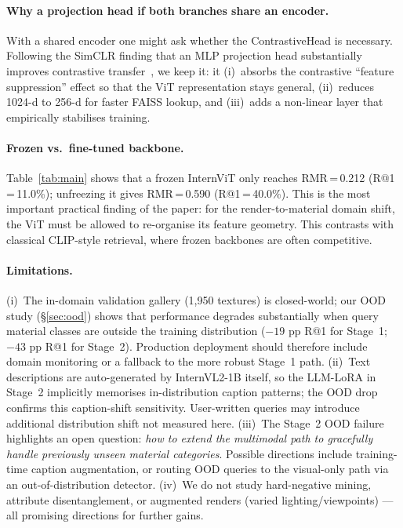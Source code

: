 \documentclass[10pt,twocolumn]{article}
\begin{document}
\paragraph{Why a projection head if both branches share an encoder.}
With a shared encoder one might ask whether the ContrastiveHead is necessary.
Following the SimCLR finding that an MLP projection head substantially
improves contrastive transfer~\cite{chen2020simclr}, we keep it: it
(i)~absorbs the contrastive ``feature suppression'' effect so that the ViT
representation stays general,
(ii)~reduces 1024-d to 256-d for faster FAISS lookup, and
(iii)~adds a non-linear layer that empirically stabilises training.

\paragraph{Frozen vs.\ fine-tuned backbone.}
Table~\ref{tab:main} shows that a frozen InternViT only reaches
RMR\,=\,0.212 (R@1\,=\,11.0\%); unfreezing it gives RMR\,=\,0.590
(R@1\,=\,40.0\%).
This is the most important practical finding of the paper: for the
render-to-material domain shift, the ViT must be allowed to re-organise
its feature geometry.
This contrasts with classical CLIP-style retrieval, where frozen backbones
are often competitive.

\paragraph{Limitations.}
(i)~The in-domain validation gallery (1,950 textures) is closed-world; our
OOD study (\S\ref{sec:ood}) shows that performance degrades substantially
when query material classes are outside the training distribution
($-19$ pp R@1 for Stage~1; $-43$ pp R@1 for Stage~2).
Production deployment should therefore include domain monitoring or a
fallback to the more robust Stage~1 path.
(ii)~Text descriptions are auto-generated by InternVL2-1B itself, so the
LLM-LoRA in Stage~2 implicitly memorises in-distribution caption patterns;
the OOD drop confirms this caption-shift sensitivity.
User-written queries may introduce additional distribution shift not measured
here.
(iii)~The Stage~2 OOD failure highlights an open question: \emph{how to
extend the multimodal path to gracefully handle previously unseen material
categories}. Possible directions include training-time caption augmentation,
or routing OOD queries to the visual-only path via an out-of-distribution
detector.
(iv)~We do not study hard-negative mining, attribute disentanglement, or
augmented renders (varied lighting/viewpoints) --- all promising directions
for further gains.
\end{document}
